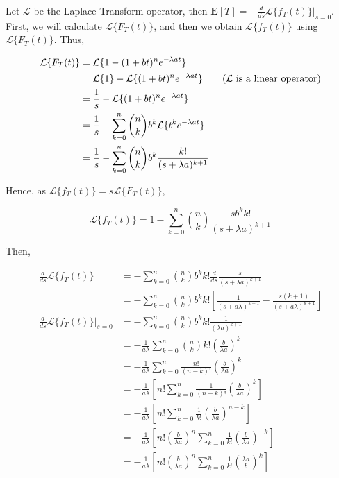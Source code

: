 Let $\mathcal{L}$ be the Laplace Transform operator, then $\mathbf{E}[T] = - \frac{d}{ds} \mathcal{L}\{f_T(t)\}|_{s=0}$. First, we will calculate $\mathcal{L}\{F_T(t)\}$, and then we obtain $\mathcal{L}\{f_T(t)\}$ using $\mathcal{L}\{F_T(t)\}$. Thus,

\begin{align*}
\mathcal{L}\{F_T(t)\} &= \mathcal{L}\{1 - (1+bt)^n e^{-\lambda at}\} \\
	&= \mathcal{L}\{1\} - \mathcal{L}\{(1+bt)^n e^{-\lambda at}\} \tag{$\mathcal{L}$ is a linear operator} \\
	&= \frac{1}{s} - \mathcal{L}\{(1+bt)^n e^{-\lambda at}\} \\
	&= \frac{1}{s} - \sum_{k=0}^n \binom{n}{k} b^k \mathcal{L}\{t^k e^{-\lambda at}\} \\
	&= \frac{1}{s} - \sum_{k=0}^n \binom{n}{k} b^k \frac{k!}{(s+\lambda a)^{k+1}}
\end{align*}

Hence, as $\mathcal{L}\{f_T(t)\} = s \mathcal{L}\{F_T(t)\}$,

$$\mathcal{L}\{f_T(t)\} = 1 - \sum_{k=0}^n \binom{n}{k} \frac{s b^k k!}{(s+\lambda a)^{k+1}}$$

Then,

\begin{align*}
\frac{d}{ds} \mathcal{L}\{f_T(t)\}
	&= - \sum_{k=0}^n \binom{n}{k} b^k k! \frac{d}{ds} \frac{s}{(s+\lambda a)^{k+1}} \\
	&= - \sum_{k=0}^n \binom{n}{k} b^k k! \left[ \frac{1}{(s+a\lambda)^{k+1}} - \frac{s(k+1)}{(s+a \lambda)^{k+1}} \right] \\
\frac{d}{ds} \mathcal{L}\{f_T(t)\}|_{s=0}
	&= - \sum_{k=0}^n \binom{n}{k} b^k k! \frac{1}{(\lambda a)^{k+1}} \\
	&= - \frac{1}{a\lambda} \sum_{k=0}^n \binom{n}{k} k! \left( \frac{b}{\lambda a} \right)^k \\
	&= - \frac{1}{a\lambda} \sum_{k=0}^n \frac{n!}{(n-k)!} \left( \frac{b}{\lambda a} \right)^k \\
	&= - \frac{1}{a\lambda} \left[ n! \sum_{k=0}^n \frac{1}{(n-k)!} \left( \frac{b}{\lambda a} \right)^k \right] \\
	&= - \frac{1}{a\lambda} \left[ n! \sum_{k=0}^n \frac{1}{k!} \left( \frac{b}{\lambda a} \right)^{n-k} \right] \tag{$k \rightarrow n-k$} \\
	&= - \frac{1}{a\lambda} \left[ n! \left(\frac{b}{\lambda a}\right)^n \sum_{k=0}^n \frac{1}{k!} \left( \frac{b}{\lambda a} \right)^{-k} \right] \\
	&= - \frac{1}{a\lambda} \left[ n! \left(\frac{b}{\lambda a}\right)^n \sum_{k=0}^n \frac{1}{k!} \left( \frac{\lambda a}{b} \right)^{k} \right]
\end{align*}

